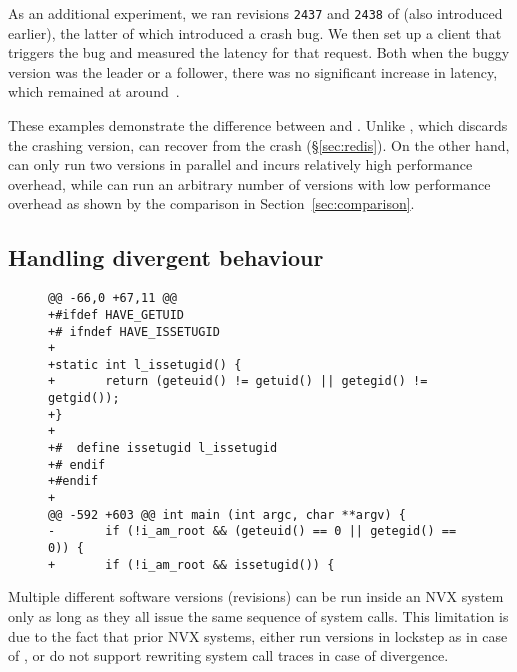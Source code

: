 As an additional experiment, we ran revisions \lstinline`2437` and
\lstinline`2438` of \lighttpd (also introduced earlier), the latter of
which introduced a crash bug.  We then set up a client that triggers the
bug and measured the latency for that request. Both when the buggy
version was the leader or a follower, there was no significant increase
in latency, which remained at around~\lighttpdnormallatency.

These examples demonstrate the difference between \mx and \varan. Unlike
\varan, which discards the crashing version, \mx can recover from the crash
(\S\ref{sec:redis}). On the other hand, \mx can only run two versions in
parallel and incurs relatively high performance overhead, while \varan can run
an arbitrary number of versions with low performance overhead as shown by the
comparison in Section~\ref{sec:comparison}.


\subsection{Handling divergent behaviour}
\label{sec:mv-execution}

\begin{figure}[t]
\begin{center}
\begin{lstlisting}[alsolanguage=diff,numbers=none,label=lst:lighttpd-suid,caption={\lighttpd SUID bit detection patch.}]
@@ -66,0 +67,11 @@
+#ifdef HAVE_GETUID
+# ifndef HAVE_ISSETUGID
+
+static int l_issetugid() {
+       return (geteuid() != getuid() || getegid() != getgid());
+}
+
+#  define issetugid l_issetugid
+# endif
+#endif
+
@@ -592 +603 @@ int main (int argc, char **argv) {
-       if (!i_am_root && (geteuid() == 0 || getegid() == 0)) {
+       if (!i_am_root && issetugid()) {
\end{lstlisting}
\end{center}
\end{figure}

Multiple different software versions (revisions) can be run inside an NVX
system only as long as they all issue the same sequence of system calls. This
limitation is due to the fact that prior NVX systems, either run versions in
lockstep as in case of \mx, or do not support rewriting system call traces in
case of divergence.

